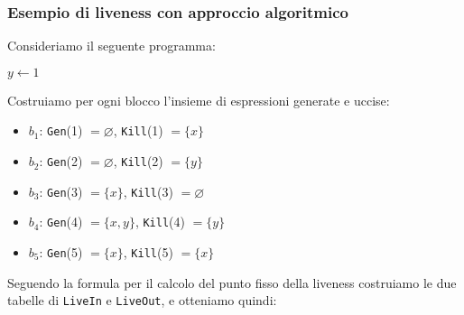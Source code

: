 \subsubsection{Esempio di liveness con approccio algoritmico}
\begin{minipage}{0.5\textwidth}
    Consideriamo il seguente programma:

    \begin{algorithm}[H]
        $y \gets 1$\;
    \end{algorithm}
    
    \end{minipage} 
    \begin{minipage}{0.5\textwidth}
    \begin{figure}[H]
        \centering
    \end{figure}
    \end{minipage}

    Costruiamo per ogni blocco l'insieme di espressioni generate e uccise:
    \begin{itemize}
        \item $b_1$: \texttt{Gen}(1) $= \varnothing$, \texttt{Kill}(1) $= \{ x \}$
        \item $b_2$: \texttt{Gen}(2) $= \varnothing$, \texttt{Kill}(2) $= \{y\}$
        \item $b_3$: \texttt{Gen}(3) $= \{x\}$, \texttt{Kill}(3) $= \varnothing$
        \item $b_4$: \texttt{Gen}(4) $= \{x,y\}$, \texttt{Kill}(4) $= \{y\}$
        \item $b_5$: \texttt{Gen}(5) $= \{x\}$, \texttt{Kill}(5) $= \{x\}$
    \end{itemize}

    Seguendo la formula per il calcolo del punto fisso della liveness 
    costruiamo le due tabelle di \texttt{LiveIn} e \texttt{LiveOut},
    e otteniamo quindi:

